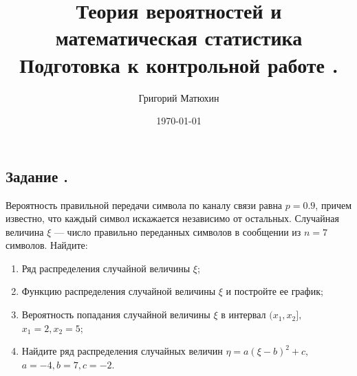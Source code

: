 \documentclass[12pt]{article}
\author{Григорий Матюхин}
\date{\today}
\title{
	Теория вероятностей и математическая статистика \\
	\large Подготовка к контрольной работе \textnumero1.
}
\begin{document}
\maketitle
\newpage
\tableofcontents
\newpage

\subsection{Задание .}
Вероятность правильной передачи символа по каналу связи равна $p = 0.9$, причем известно, что каждый символ искажается независимо от остальных.
Случайная величина $\xi$ --- число правильно переданных символов в сообщении из $n = 7$ символов. Найдите:
\begin{enumerate}
	\item Ряд распределения случайной величины $\xi$;
	\item Функцию распределения случайной величины $\xi$ и постройте ее график;
	\item Вероятность попадания случайной величины $\xi$ в интервал $(x_1, x_2],$ $ x_1 = 2, x_2 = 5$;
	\item Найдите ряд распределения случайных величин $\eta = a(\xi - b)^2 + c,$ $ a = -4, b = 7, c = -2$.
\end{enumerate}
\end{document}

